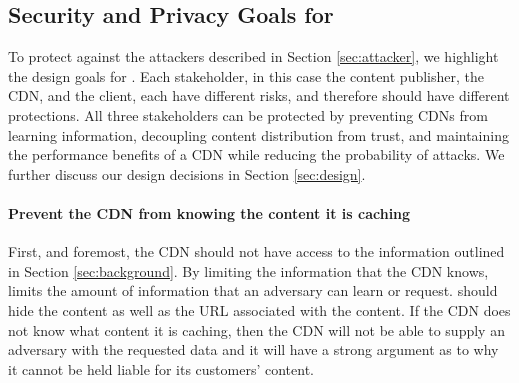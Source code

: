\subsection{Security and Privacy Goals for \system{}}
\label{sec:goals}
To protect against the attackers described in Section 
\ref{sec:attacker}, we highlight the design goals for \system{}. 
Each stakeholder, in this case the content publisher, the CDN, and the client, each have 
different risks, and therefore should have different protections.  All three stakeholders 
can be protected by preventing CDNs from learning information, decoupling content distribution from trust, and 
maintaining the performance benefits of a CDN while reducing the probability of attacks.  
We further discuss our design decisions in Section \ref{sec:design}.


\paragraph{Prevent the CDN from knowing the content it is caching} First, and foremost, the CDN 
should not have access to the information outlined 
in Section \ref{sec:background}.  By limiting the information that the CDN knows, \system{} limits 
the amount of information that an adversary can learn or request.  \system{} should hide 
the content as well as the URL associated with the content.  If the CDN 
does not know what content it is caching, then the CDN will not be able to supply an adversary 
with the requested data and it will have a strong argument as to why it cannot be held 
liable for its customers' content.

